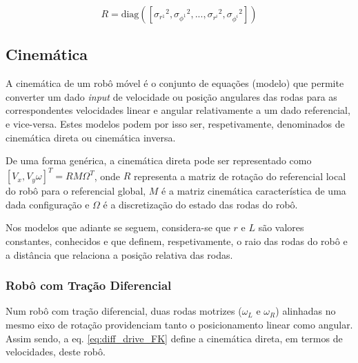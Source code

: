 \documentclass{article}
\begin{document}
\begin{equation}
    R = \text{diag}([{\sigma_{r^1}}^2, {\sigma_{\phi^1}}^2, ..., {\sigma_{r^i}}^2, {\sigma_{\phi^i}}^2])
    \label{eq:covar_obervation}
\end{equation}

\subsection{Cinemática}

A cinemática de um robô móvel é o conjunto de equações (modelo) que permite converter um dado \textit{input} de velocidade ou posição angulares das rodas para as correspondentes velocidades linear e angular relativamente a um dado referencial, e vice-versa. Estes modelos podem por isso ser, respetivamente, denominados de cinemática direta ou cinemática inversa. 

De uma forma genérica, a cinemática direta pode ser representado como $[V_x, V_y \omega]^T = R M \Omega^T$, onde $R$ representa a matriz de rotação do referencial local do robô para o referencial global, $M$ é a matriz cinemática característica de uma dada configuração e $\Omega$ é a discretização do estado das rodas do robô.

Nos modelos que adiante se seguem, considera-se que $r$ e $L$ são valores constantes, conhecidos e que definem, respetivamente, o raio das rodas do robô e a distância que relaciona a posição relativa das rodas.

\subsubsection{Robô com Tração Diferencial}

Num robô com tração diferencial, duas rodas motrizes ($\omega_L$ e $\omega_R$) alinhadas no mesmo eixo de rotação providenciam tanto o posicionamento linear como angular. Assim sendo, a eq. \ref{eq:diff_drive_FK} define a cinemática direta, em termos de velocidades, deste robô.
\end{document}

